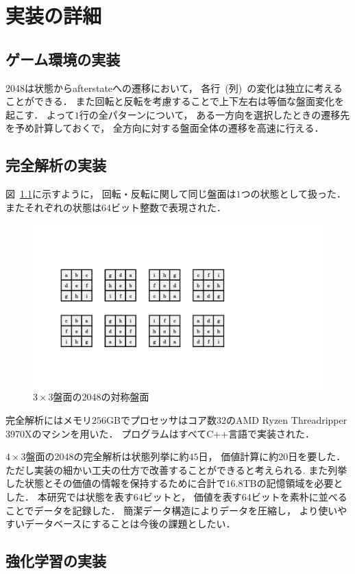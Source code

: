 \chapter{実装の詳細}

\section{ゲーム環境の実装}
\label{sec:game_impl}
2048は状態からafterstateへの遷移において， 各行~(列)~の変化は独立に考えることができる．
また回転と反転を考慮することで上下左右は等価な盤面変化を起こす．
よって$1$行の全パターンについて， ある一方向を選択したときの遷移先を予め計算しておくで， 全方向に対する盤面全体の遷移を高速に行える．

\section{完全解析の実装}
図~\ref{fig:symmtric_boards}に示すように， 回転・反転に関して同じ盤面は$1$つの状態として扱った．
またそれぞれの状態は$64$ビット整数で表現された．
\begin{figure}[t]
    \centering
    \includegraphics[width=0.6\linewidth{}]{figures/symmetric.pdf}
    \caption{$3\times3$盤面の2048の対称盤面}
    \label{fig:symmtric_boards}
\end{figure}
完全解析にはメモリ$256$GBでプロセッサはコア数$32$のAMD Ryzen Threadripper 3970Xのマシンを用いた．
プログラムはすべてC++言語で実装された．

$4\times3$盤面の2048の完全解析は状態列挙に約$45$日， 価値計算に約$20$日を要した．
ただし実装の細かい工夫の仕方で改善することができると考えられる.
また列挙した状態とその価値の情報を保持するために合計で$16.8$TBの記憶領域を必要とした．
本研究では状態を表す$64$ビットと， 価値を表す$64$ビットを素朴に並べることでデータを記録した．
簡潔データ構造によりデータを圧縮し， より使いやすいデータベースにすることは今後の課題としたい．

\section{強化学習の実装}
